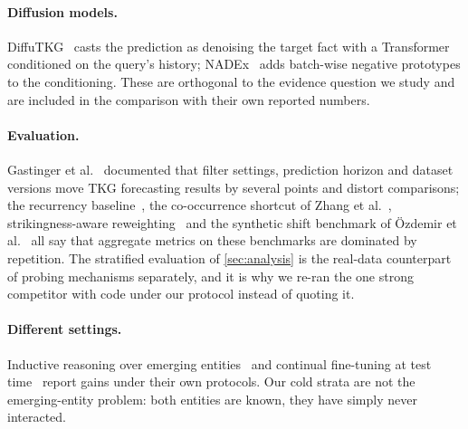 \paragraph{Diffusion models.}
DiffuTKG~\cite{cai2024diffutkg} casts the prediction as denoising the target fact with a Transformer conditioned on the query's history; NADEx~\cite{nadex2026} adds batch-wise negative prototypes to the conditioning. These are orthogonal to the evidence question we study and are included in the comparison with their own reported numbers.

\paragraph{Evaluation.}
Gastinger et al.~\cite{gastinger2023apples} documented that filter settings, prediction horizon and dataset versions move TKG forecasting results by several points and distort comparisons; the recurrency baseline~\cite{gastinger2024history}, the co-occurrence shortcut of Zhang et al.~\cite{zhang2026evolution}, strikingness-aware reweighting~\cite{strikingness2026} and the synthetic shift benchmark of \"Ozdemir et al.~\cite{shift2026} all say that aggregate metrics on these benchmarks are dominated by repetition. The stratified evaluation of \cref{sec:analysis} is the real-data counterpart of probing mechanisms separately, and it is why we re-ran the one strong competitor with code under our protocol instead of quoting it.

\paragraph{Different settings.}
Inductive reasoning over emerging entities~\cite{transfir2026,adatkg2026} and continual fine-tuning at test time~\cite{hitscl2026} report gains under their own protocols. Our cold strata are not the emerging-entity problem: both entities are known, they have simply never interacted.
